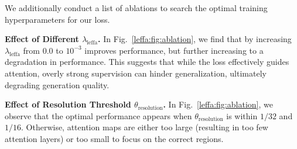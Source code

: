 We additionally conduct a list of ablations to search the optimal training hyperparameters for our \leffa{} loss.

\noindent \textbf{Effect of Different $\lambda_{\text{leffa}}$.} 
In Fig.~\ref{leffa:fig:ablation}, we find that by increasing $\lambda_{\text{leffa}}$ from $0.0$ to $10^{-3}$ improves performance, but further increasing to a degradation in performance.
This suggests that while the \leffa{} loss effectively guides attention, overly strong supervision can hinder generalization, ultimately degrading generation quality.



\noindent \textbf{Effect of Resolution Threshold $\theta_{\text{resolution}}$.}
In Fig.~\ref{leffa:fig:ablation}, we observe that the optimal performance appears when $\theta_{\text{resolution}}$ is within $1/32$ and $1/16$.
Otherwise, attention maps are either too large (resulting in too few attention layers) or too small to focus on the correct regions.

